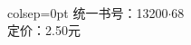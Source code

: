 \documentclass[../outline-of-mechanics.tex]{subfiles}
\begin{document}
\clearpage
\thispagestyle{empty}
\mbox{~}

\vspace{37em}
\hspace{15em}
\begin{tblr}{colsep=0pt}
统一书号：13200$\cdot$68 \\
\toprule
定\qquad 价：2.50\quad 元
\end{tblr}
\end{document}
